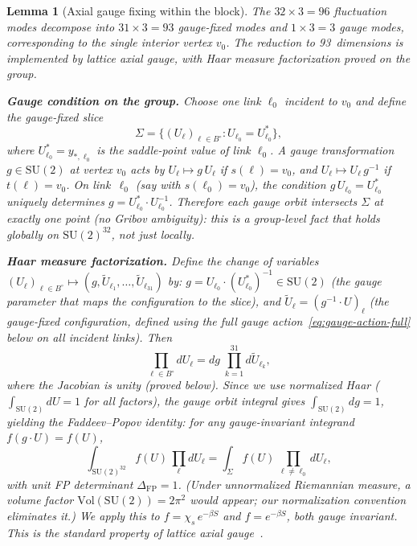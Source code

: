 \documentclass[11pt]{article}
\newtheorem{lemma}[theorem]{Lemma}
\theoremstyle{definition}
\newcommand{\SU}{\mathrm{SU}}
\begin{document}
\begin{lemma}[Axial gauge fixing within the block]\label{lem:axial}
The $32\times 3=96$ fluctuation modes decompose into
$31\times 3=93$ gauge-fixed modes and $1\times 3=3$ gauge modes,
corresponding to the single interior vertex $v_0$.
The reduction to 93~dimensions is implemented by lattice axial gauge,
with Haar measure factorization proved on the group.

\textbf{Gauge condition on the group.}
Choose one link $\ell_0$ incident to $v_0$ and define the
gauge-fixed slice
\begin{equation}\label{eq:gauge-slice}
\Sigma=\{(U_\ell)_{\ell\in B^\circ}:U_{\ell_0}=U_{\ell_0}^*\},
\end{equation}
where $U_{\ell_0}^*=y_{*,\ell_0}$ is the saddle-point value of
link $\ell_0$.  A gauge transformation $g\in\SU(2)$ at vertex
$v_0$ acts by $U_\ell\mapsto g\,U_\ell$ if $s(\ell)=v_0$, and
$U_\ell\mapsto U_\ell\,g^{-1}$ if $t(\ell)=v_0$.  On link~$\ell_0$
(say with $s(\ell_0)=v_0$), the condition $g\,U_{\ell_0}=U_{\ell_0}^*$
uniquely determines $g=U_{\ell_0}^*\cdot U_{\ell_0}^{-1}$.
Therefore each gauge orbit intersects $\Sigma$ at exactly one point
(no Gribov ambiguity): this is a \emph{group-level} fact that holds
globally on $\SU(2)^{32}$, not just locally.

\textbf{Haar measure factorization.}
Define the change of variables
$(U_\ell)_{\ell\in B^\circ}\mapsto(g,\widetilde{U}_{\ell_1},\ldots,
\widetilde{U}_{\ell_{31}})$ by:
$g=U_{\ell_0}\cdot(U_{\ell_0}^*)^{-1}\in\SU(2)$
(the gauge parameter that maps the
configuration to the slice), and
$\widetilde{U}_\ell=(g^{-1}\cdot U)_\ell$ (the gauge-fixed
configuration, defined using the full gauge action~\eqref{eq:gauge-action-full} below on all incident links).
Then
\begin{equation}\label{eq:haar-factor}
\prod_{\ell\in B^\circ}dU_\ell
=dg\;\prod_{k=1}^{31}d\widetilde{U}_{\ell_k},
\end{equation}
where the Jacobian is unity (proved below).
Since we use normalized Haar ($\int_{\SU(2)}dU=1$ for all factors),
the gauge orbit integral gives $\int_{\SU(2)}dg=1$,
yielding the Faddeev--Popov identity: for any gauge-invariant
integrand $f(g\cdot U)=f(U)$,
\begin{equation}\label{eq:FP}
\int_{\SU(2)^{32}}f(U)\,\prod_\ell dU_\ell
=\int_{\Sigma}
f(U)\,\prod_{\ell\ne\ell_0}dU_\ell,
\end{equation}
with unit FP determinant $\Delta_{\mathrm{FP}}=1$.
(Under unnormalized Riemannian measure, a volume factor
$\mathrm{Vol}(\SU(2))=2\pi^2$ would appear; our normalization
convention eliminates it.)
We apply this to $f=\chi_s\,e^{-\beta S}$ and $f=e^{-\beta S}$,
both gauge invariant.  This is the standard property of lattice
axial gauge~\cite{Creutz}.


\end{lemma}
\end{document}
